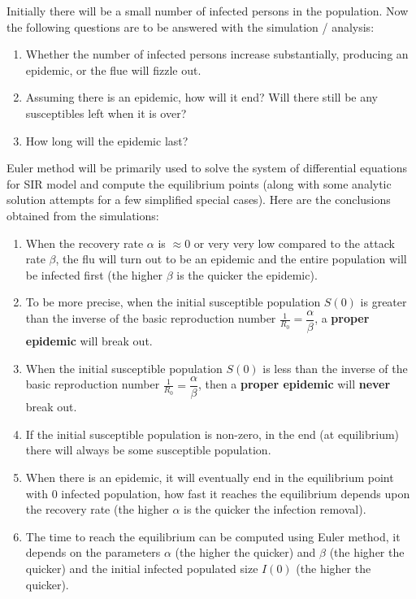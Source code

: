 \documentclass[11pt, a4paper, twoside]{report}
\begin{document}
Initially there will be a small number of infected persons in the population. Now the following questions are to be answered with the simulation / analysis:

\begin{enumerate}
\item Whether the number of infected persons increase substantially, producing an epidemic, or the flue will fizzle out. 
\item Assuming there is an epidemic, how will it end? Will there still be any susceptibles left when it is over? 
\item How long will the epidemic last?
\end{enumerate}

Euler method will be primarily used to solve the system of differential equations for SIR model and compute the equilibrium points (along with some analytic solution attempts for a few simplified special cases). Here are the conclusions obtained from the simulations:

\begin{enumerate}
\item When the recovery rate $\alpha$ is $\approx 0$ or very very low compared to the attack rate $\beta$, the flu will turn out to be an epidemic and the entire population will be infected first (the higher $\beta$ is the quicker the epidemic). 
\item To be more precise, when the initial susceptible population $S(0)$ is greater than the inverse of the basic reproduction number $\frac{1}{R_0} = \dfrac{\alpha}{\beta}$, a \textbf{proper epidemic} will break out. 
\item When the initial susceptible population $S(0)$ is less than the inverse of the basic reproduction number $\frac{1}{R_0} = \dfrac{\alpha}{\beta}$, then a \textbf{proper epidemic} will \textbf{never} break out.
\item If the initial susceptible population is non-zero, in the end (at equilibrium) there will always be some susceptible population.
\item When there is an epidemic, it will eventually end in the equilibrium point with $0$ infected population, how fast it reaches the equilibrium depends upon the recovery rate (the higher $\alpha$ is the quicker the infection removal).
\item The time to reach the equilibrium can be computed using Euler method, it depends on the parameters $\alpha$ (the higher the quicker) and $\beta$ (the higher the quicker) and the initial infected populated size $I(0)$ (the higher the quicker).
\end{enumerate}
\end{document}
